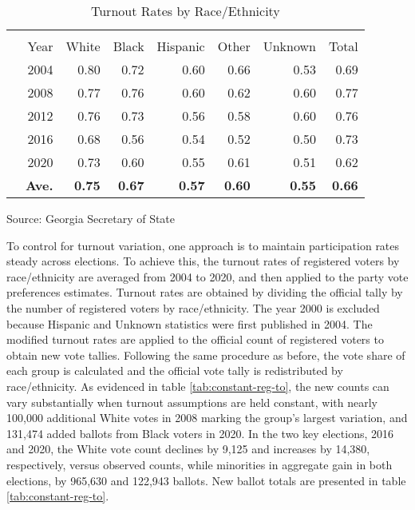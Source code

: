 \begin{table}[ht]
\centering
\begin{threeparttable}
\caption{Turnout Rates by Race/Ethnicity}  
\label{tab:ave-to-rates}
\centering
\begin{tabular}{rrrrrrrr}
  \hline \\ \vspace{0.5em} 
 & Year & White & Black & Hispanic & Other & Unknown & Total \vspace{0.5em} \\
  \hline
 & 2004& 0.80 & 0.72 & 0.60 & 0.66 & 0.53 & 0.69\\ 
 & 2008 & 0.77 & 0.76 & 0.60 & 0.62 & 0.60 & 0.77\\ 
  & 2012 & 0.76 & 0.73 & 0.56 & 0.58 & 0.60 & 0.76  \\ 
   & 2016& 0.68 & 0.56 & 0.54 & 0.52 & 0.50 & 0.73\\ 
   & 2020& 0.73 & 0.60 & 0.55 & 0.61 & 0.51 & 0.62\\ 
  & \textbf{Ave.} & \textbf{0.75} & \textbf{0.67} & \textbf{0.57} & \textbf{0.60} & \textbf{0.55} & \textbf{0.66} \vspace{0.5em}\\ 
   \hline
\end{tabular}
{\footnotesize Source: Georgia Secretary of State}
\end{threeparttable}
\end{table}



To control for turnout variation, one approach is to maintain participation rates steady across elections. To achieve this, the turnout rates of registered voters by race/ethnicity are averaged from 2004 to 2020, and then applied to the party vote preferences estimates. Turnout rates are obtained by dividing the official tally by the number of registered voters by race/ethnicity. The year 2000 is excluded because Hispanic and Unknown statistics were first published in 2004. The modified turnout rates are applied to the official count of registered voters to obtain new vote tallies. Following the same procedure as before, the vote share of each group is calculated and the official vote tally is redistributed by race/ethnicity. As evidenced in table \ref{tab:constant-reg-to}, the new counts can vary substantially when turnout assumptions are held constant, with nearly 100,000 additional White votes in 2008 marking the group's largest variation, and 131,474 added ballots from Black voters in 2020. In the two key elections, 2016 and 2020, the White vote count declines by 9,125 and increases by 14,380, respectively, versus observed counts, while minorities in aggregate gain in both elections, by 965,630 and 122,943 ballots. New ballot totals are presented in table \ref{tab:constant-reg-to}.




